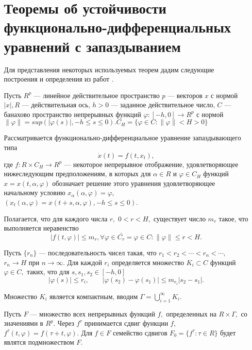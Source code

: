 \section{Теоремы об устойчивости функционально-дифференциальных уравнений с запаздыванием} \label{p11}

	
	Для представления некоторых используемых теорем дадим следующие построения и определения из работ \cite{andr10}.

	Пусть $R^p$ --- линейное действительное пространство $p$ --- векторов $x$ с нормой $|x|,  R$ 
	--- действительная ось, $h>0$ --- заданное действительное число, $C$ --- банахово пространство
	непрерывных функций $\varphi:[-h,0] \rightarrow R^p$ с нормой $\|\varphi\|=sup(|\varphi(s)|,-h \le s \le 0). C_H = \{\varphi \in C : \| \varphi \| < H > 0\}$
	
	Рассматривается функционально-дифференциальное
	уравнение запаздывающего типа
	\begin{equation}
	\dot x(t) = f(t,x_t), \label{1.1'}
	\end{equation}
	где $f: R \times C_{H}\to R^p$ --- некоторое непрерывное отображение,
	удовлетворяющее  нижеследующим предположениям, в которых для $\alpha \in R$ и $\varphi \in C_H$ функций $x = x(t, \alpha, \varphi)$ обозначает решение этого уравнения удовлетворяющее начальному условию $x_{\alpha} (\alpha, \varphi) = \varphi,$ $(x_{t} (\alpha, \varphi) = x (t + s, \alpha, \varphi), -h \le s \le 0)$.
	
	Полагается, что для каждого  числа $r,$ $0<r<H,$ существует число $m_r$ такое, что выполняется неравенство
		\begin{equation}\label{1.2'}
		\left| f(t, \varphi) \right|\le m_r, \forall \varphi \in \bar{C_r} = {\varphi \in C: \| \varphi \| \le r < H}.
		\end{equation}
	
	Пусть $\{r_n\}$ ---
	последовательность чисел такая, что $r_1<r_2<\cdots <r_n<\cdots, $
	$r_n\to H$ при $n\to \infty .$ Для каждой $r_i$ определяется
	множество $K_i\subset C$ функций $\varphi \in C,$ таких, что
	для $s, s_1,s_2 \in [-h,0]$  $$|\varphi (s)|\le r_i, \qquad
	|\varphi (s_2)-\varphi (s_1)|\le m_{r_i} |s_2-s_1|.$$
	
	Множество $K_i$ является компактным, вводим $\Gamma =\bigcup\limits_{i=1}^{\infty } {K_i}.$
	
	Пусть $F$ --- множество всех непрерывных функций $f,$
	определенных на $R \times \Gamma,$ со значениями в $R^p.$
	Через $f^{\tau }$ принимается сдвиг функции $f,$ $f^{\tau }(t,\varphi )=f(\tau +t,\varphi ).$
	Для $f\in F$ семейство сдвигов $F_0=\{f^{\tau }:\tau\in
	R\}$ будет являтся подмножеством $F.$
	
